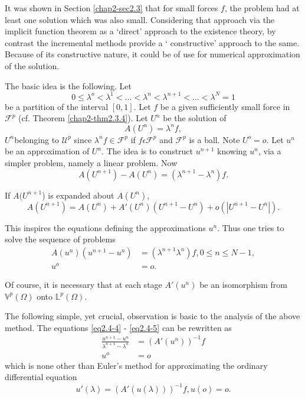 It was shown in Section \ref{chap2-sec2.3} that for small forces $f$,
the problem 
had at least one solution which was also small. Considering that
approach via the implicit function theorem as a `direct' approach to
the existence theory, by contrast the incremental methods provide a `
constructive' approach to the same. Because of its constructive
nature, it could be of use for numerical approximation of the
solution. 
 
 The basic idea is the following. Let
 $$
 0 \leq \lambda ^o <\lambda ^1 < \ldots < \lambda^n < \lambda^{n+1} <
 \ldots < \lambda ^N =1 
 $$
 be a partition of the interval $[0,1]$. Let $f$ be a given sufficiently
 small force in $\mathscr{F}^p$ (cf. Theorem \ref{chap2-thm2.3.4}). 
Let $U^n$ be the solution of  
 \begin{equation*}
   A(U^n) = \lambda^n f, \tag{2.4-3}\label{eq2.4-3}
 \end{equation*} 
$U^n$\pageoriginale belonging to $\mathcal{U}^p$ since $\lambda^n f \in
 \mathscr{F}^p$ if $f \epsilon \mathscr{F}^p$ and $\mathscr{F}^p$ is
 a ball. Note $U^o = o$. Let $u^n$ be an approximation of $U^n$. The
 idea is to construct $u^{n+1}$ knowing $u^n$, via a simpler problem,
 namely a linear problem. Now  
$$
A(U^{n+1}) - A(U^n) = (\lambda^{n+1} - \lambda^n)f.
$$

If $A(U^{n+1}$) is expanded about $A(U^n)$,
$$
A(U^{n+1}) = A(U^{n}) + A' (U^n) (U^{n+1} - U^n) + o(|U^{n+1} - U^n |).
$$

This inspires the equations defining the approximations $u^n$. Thus
one tries to solve the sequence of problems 
\begin{align*}
  A(u^{n}) (u^{n+1} - u^n ) & = (\lambda^{n+1} \lambda^n )f , 0 \le n
  \le N -1, \tag{2.4-4}\label{eq2.4-4}\\ 
  u^o & = o. \tag{2.4-5}\label{eq2.4-5}
\end{align*}

Of course, it is necessary that at each stage $A' (u^n)$ be an
isomorphism from $\mathbb{V}^p(\Omega)$ onto $\mathbb{L}^p (\Omega)$. 

The following simple, yet crucial, observation is basic to the
analysis of the above method. The equations \eqref{eq2.4-4}
- \eqref{eq2.4-5} can be rewritten as  
\begin{align*}
  \frac{u^{n+1} - u^n}{\lambda^{n+1} - \lambda^n} & = (A'(u^n))^{-1} f
  \tag{2.4-6}\label{eq2.4-6} \\ 
  u^o & = o \tag{2.4-7}\label{eq2.4-7}
\end{align*}
which is none other than Euler's method for
approximating the ordinary 
differential equation 
\begin{equation*}
  u'(\lambda) = (A'(u(\lambda)))^{-1} f, u(o) = o. \tag{2.4-8}\label{eq2.4-8}
\end{equation*}

